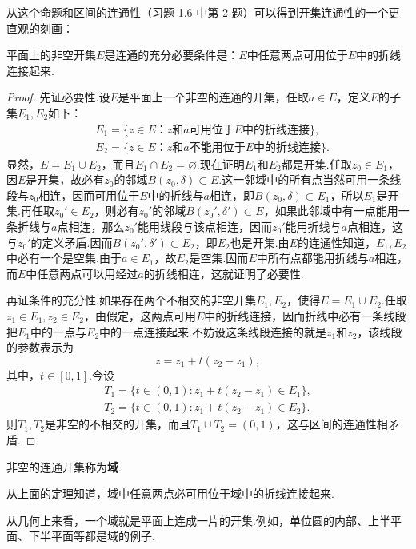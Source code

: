 从这个命题和区间的连通性（习题 \hyperlink{xiti1.6}{1.6} 中第 \hyperlink{xiti1.6.2}{2} 题）可以得到开集连通性的一个更直观的刻画：
\begin{theorem}
  平面上的非空开集$E$是连通的充分必要条件是：$E$中任意两点可用位于$E$中的折线连接起来.
\end{theorem}
\begin{proof}
  先证必要性.设$E$是平面上一个非空的连通的开集，任取$a\in E$，定义$E$的子集$E_1,E_2$如下：
  \begin{align*}
    & E_1 = \mbox{$\{z\in E$：$z$和$a$可用位于$E$中的折线连接$\}$},\\
    & E_2 = \mbox{$\{z\in E$：$z$和$a$不能用位于$E$中的折线连接$\}$}.
  \end{align*}
  显然，$E=E_1\cup E_2$，而且$E_1\cap E_2=\varnothing$.现在证明$E_1$和$E_2$都是开集.任取$z_0\in E_1$，因$E$是开集，故必有$z_0$的邻域$B(z_0,\delta)\subset E$.这一邻域中的所有点当然可用一条线段与$z_0$相连，因而可用位于$E$中的折线与$a$相连，即$B(z_0,\delta)\subset E_1$，所以$E_1$是开集.再任取$z_0'\in E_2 $，则必有$z_0'$的邻域$B(z_0',\delta')\subset E$，如果此邻域中有一点能用一条折线与$a$点相连，那么$z_0'$能用线段与该点相连，因而$z_0'$能用折线与$a$点相连，这与$z_0'$的定义矛盾.因而$B(z_0',\delta')\subset E_2$，即$E_2$也是开集.由$E$的连通性知道，$E_1,E_2$中必有一个是空集.由于$a\in E_1$，故$E_2$是空集.因而$E$中所有点都能用折线与$a$相连，而$E$中任意两点可以用经过$a$的折线相连，这就证明了必要性.

  再证条件的充分性.如果存在两个不相交的非空开集$E_1,E_2$，使得$E=E_1\cup E_2$.任取$z_1\in E_1,z_2\in E_2$，由假定，这两点可用$E$中的折线连接，因而折线中必有一条线段把$E_1$中的一点与$E_2$中的一点连接起来.不妨设这条线段连接的就是$z_1$和$z_2$，该线段的参数表示为
  \[
    z = z_1 + t (z_2 - z_1),
  \]
  其中，$t\in[0,1]$.今设
  \begin{gather*}
    T_1 = \{t\in(0,1):z_1 + t(z_2-z_1)\in E_1\},\\
    T_2 = \{t\in(0,1):z_1 + t(z_2-z_1)\in E_2\}.
  \end{gather*}
  则$T_1,T_2$是非空的不相交的开集，而且$T_1\cup T_2=(0,1)$，这与区间的连通性相矛盾.
\end{proof}
\begin{definition}
  非空的连通开集称为\textbf{域}.
\end{definition}

从上面的定理知道，域中任意两点必可用位于域中的折线连接起来.

从几何上来看，一个域就是平面上连成一片的开集.例如，单位圆的内部、上半平面、下半平面等都是域的例子.

